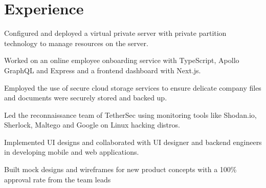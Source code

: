 \documentclass[]{openfont}
\begin{document}
%
%

%
%


\begin{minipage}[t]{0.66\textwidth} 

\section{Experience}
\vspace{\topsep}
\vspace{\topsep}
\begin{tightemize}
\item Configured and deployed a virtual private server with private partition technology to manage resources on the server.
\item Worked on an online employee onboarding service with TypeScript, Apollo GraphQL and Express and a frontend dashboard with Next.js.
\item Employed the use of secure cloud storage services to ensure delicate company files and documents were securely stored and backed up.
\end{tightemize}
\sectionsep

\vspace{\topsep}
\begin{tightemize}
\item Led the reconnaissance team of TetherSec using monitoring tools like Shodan.io, Sherlock, Maltego and Google on Linux hacking distros.
\item Implemented UI designs and collaborated with UI designer and backend engineers in developing mobile and web applications.
\item Built mock designs and wireframes for new product concepts with a 100\% approval rate from the team leads
\end{tightemize}
\sectionsep


\end{minipage}
\end{document}
